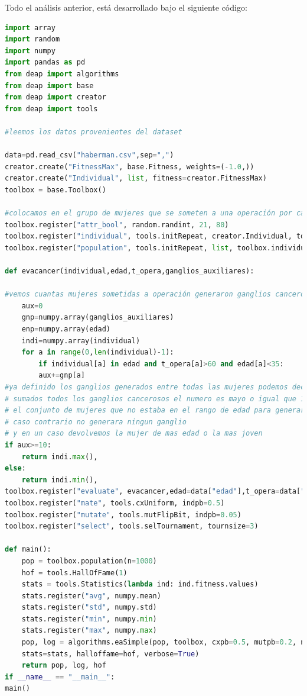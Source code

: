 Todo el análisis anterior, está desarrollado bajo el siguiente código:

\begin{lstlisting}[language=python]
import array
import random
import numpy
import pandas as pd
from deap import algorithms
from deap import base
from deap import creator
from deap import tools

#leemos los datos provenientes del dataset

data=pd.read_csv("haberman.csv",sep=",")
creator.create("FitnessMax", base.Fitness, weights=(-1.0,))
creator.create("Individual", list, fitness=creator.FitnessMax)
toolbox = base.Toolbox()

#colocamos en el grupo de mujeres que se someten a una operación por cancer de mama entre 21 y 50 años
toolbox.register("attr_bool", random.randint, 21, 80)
toolbox.register("individual", tools.initRepeat, creator.Individual, toolbox.attr_bool, 10)
toolbox.register("population", tools.initRepeat, list, toolbox.individual)

def evacancer(individual,edad,t_opera,ganglios_auxiliares):

#vemos cuantas mujeres sometidas a operación generaron ganglios cancerosos en el grupo de 10 mujeres
	aux=0
	gnp=numpy.array(ganglios_auxiliares)
	enp=numpy.array(edad)
	indi=numpy.array(individual)
	for a in range(0,len(individual)-1):
		if individual[a] in edad and t_opera[a]>60 and edad[a]<35:
		aux+=gnp[a]
#ya definido los ganglios generados entre todas las mujeres podemos decir que si 
# sumados todos los ganglios cancerosos el numero es mayo o igual que 10 
# el conjunto de mujeres que no estaba en el rango de edad para generar ganglios cancerosos, generara 1 
# caso contrario no generara ningun ganglio
# y en un caso devolvemos la mujer de mas edad o la mas joven 
if aux>=10:
	return indi.max(),
else:
	return indi.min(),
toolbox.register("evaluate", evacancer,edad=data["edad"],t_opera=data["year"],ganglios_auxiliares=data["auxilia"])
toolbox.register("mate", tools.cxUniform, indpb=0.5)
toolbox.register("mutate", tools.mutFlipBit, indpb=0.05)
toolbox.register("select", tools.selTournament, tournsize=3)

def main():
	pop = toolbox.population(n=1000)
	hof = tools.HallOfFame(1)
	stats = tools.Statistics(lambda ind: ind.fitness.values)
	stats.register("avg", numpy.mean)
	stats.register("std", numpy.std)
	stats.register("min", numpy.min)
	stats.register("max", numpy.max)
	pop, log = algorithms.eaSimple(pop, toolbox, cxpb=0.5, mutpb=0.2, ngen=20, 
	stats=stats, halloffame=hof, verbose=True)
	return pop, log, hof
if __name__ == "__main__":
main()
\end{lstlisting}
